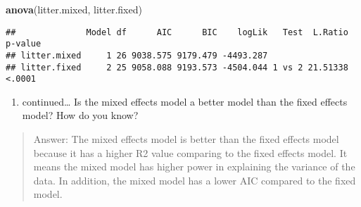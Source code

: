 \documentclass[]{article}
\newenvironment{Shaded}{\begin{snugshade}}{\end{snugshade}}
\newcommand{\KeywordTok}[1]{\textcolor[rgb]{0.13,0.29,0.53}{\textbf{#1}}}
\newcommand{\NormalTok}[1]{#1}
\providecommand{\tightlist}{%
  \setlength{\itemsep}{0pt}\setlength{\parskip}{0pt}}
\begin{document}
\begin{Shaded}
\begin{Highlighting}[]
\KeywordTok{anova}\NormalTok{(litter.mixed, litter.fixed)}
\end{Highlighting}
\end{Shaded}

\begin{verbatim}
##              Model df      AIC      BIC    logLik   Test  L.Ratio p-value
## litter.mixed     1 26 9038.575 9179.479 -4493.287                        
## litter.fixed     2 25 9058.088 9193.573 -4504.044 1 vs 2 21.51338  <.0001
\end{verbatim}

\begin{enumerate}
\def\labelenumi{\alph{enumi}.}
\setcounter{enumi}{3}
\tightlist
\item
  continued\ldots{} Is the mixed effects model a better model than the
  fixed effects model? How do you know?
\end{enumerate}

\begin{quote}
Answer: The mixed effects model is better than the fixed effects model
because it has a higher R2 value comparing to the fixed effects model.
It means the mixed model has higher power in explaining the variance of
the data. In addition, the mixed model has a lower AIC compared to the
fixed model.
\end{quote}
\end{document}
